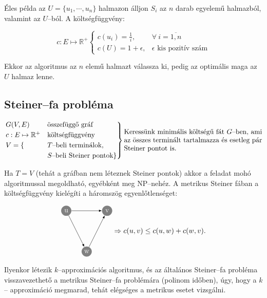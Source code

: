 Éles példa az $U=\{ u_1, \cdots, u_n \}$ halmazon álljon $S_i$ az $n$ darab
egyelemű halmazból, valamint az $U$--ból. A költségfüggvény:

\[ c:E \mapsto \mathbb{R}^+ \begin{cases} c({u_i})=\frac{1}{i}, & \forall~
              i=\overline{1,n}                                          \\
              c(U)=1 + \epsilon,    & \epsilon \mbox{ kis pozitív szám}\end{cases}\]

Ekkor az algoritmus az $n$ elemű halmazt válassza ki, pedig az optimális maga
az $U$ halmaz lenne.

\subsection{Steiner--fa probléma}

\[
	\begin{rcases}
		G(V,E)                   & \mbox{összefüggő gráf}          \\
		c:E \mapsto \mathbb{R}^+ & \mbox{költségfüggvény}          \\
		V = \{                   & T\mbox{--beli terminálok},      \\
		                         & S\mbox{--beli Steiner pontok}\}
	\end{rcases}
	\parbox[L]{7cm}{ Keressünk minimális költségű fát $G$--ben, ami az összes
		terminált tartalmazza és esetleg pár Steiner pontot is.} \]

Ha $T=V$ (tehát a gráfban nem léteznek Steiner pontok) akkor a feladat mohó
algoritmussal megoldható, egyébként meg NP--nehéz. A metrikus Steiner fában
a költségfüggvény kielégíti a háromszög egyenlőtlenséget:


\[ \parbox[l]{2.5cm}{
		\begin{tikzpicture}[scale=1]
			\tikzset{ p/.style={circle,white,fill=gray,inner sep=0pt,minimum size=0.5cm},
			}
			\node[p] (1) at (0, -3) {w};
			\node[p] (2) at (-1, -1) {u};
			\node[p] (3) at (+1 , -1) {v};

			\draw[-latex] (2) -- (1) node [midway, above] {};
			\draw[-latex] (2) -- (3) node [midway, below] {};
			\draw[-latex] (1) -- (3) node [midway, above] {};
		\end{tikzpicture}} \Rightarrow
	c(u,v) \leq c(u,w)+c(w,v).
\]

Ilyenkor létezik $k$--approximációs algoritmus, és az általános Steiner--fa
probléma visszavezethető a metrikus Steiner--fa problémára (polinom időben),
úgy, hogy a $k$-- approximáció megmarad, tehát elégséges a metrikus esetet
vizsgálni.

